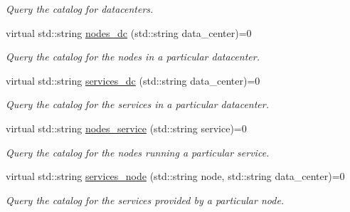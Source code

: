 \begin{DoxyCompactItemize}
\begin{DoxyCompactList}\small\item\em Query the catalog for datacenters. \end{DoxyCompactList}\item 
virtual std\+::string \hyperlink{classConsulInterface_a0831246af1b80ce5bbe074a47333c615}{nodes\+\_\+dc} (std\+::string data\+\_\+center)=0\hypertarget{classConsulInterface_a0831246af1b80ce5bbe074a47333c615}{}\label{classConsulInterface_a0831246af1b80ce5bbe074a47333c615}

\begin{DoxyCompactList}\small\item\em Query the catalog for the nodes in a particular datacenter. \end{DoxyCompactList}\item 
virtual std\+::string \hyperlink{classConsulInterface_ab1c3f2169a8aebdb5a66cfe8211330dc}{services\+\_\+dc} (std\+::string data\+\_\+center)=0\hypertarget{classConsulInterface_ab1c3f2169a8aebdb5a66cfe8211330dc}{}\label{classConsulInterface_ab1c3f2169a8aebdb5a66cfe8211330dc}

\begin{DoxyCompactList}\small\item\em Query the catalog for the services in a particular datacenter. \end{DoxyCompactList}\item 
virtual std\+::string \hyperlink{classConsulInterface_a7490a960b2e10855c7d7ff09d87942b8}{nodes\+\_\+service} (std\+::string service)=0\hypertarget{classConsulInterface_a7490a960b2e10855c7d7ff09d87942b8}{}\label{classConsulInterface_a7490a960b2e10855c7d7ff09d87942b8}

\begin{DoxyCompactList}\small\item\em Query the catalog for the nodes running a particular service. \end{DoxyCompactList}\item 
virtual std\+::string \hyperlink{classConsulInterface_abbd5b2839d3548d48e93074a53844f40}{services\+\_\+node} (std\+::string node, std\+::string data\+\_\+center)=0\hypertarget{classConsulInterface_abbd5b2839d3548d48e93074a53844f40}{}\label{classConsulInterface_abbd5b2839d3548d48e93074a53844f40}

\begin{DoxyCompactList}\small\item\em Query the catalog for the services provided by a particular node. \end{DoxyCompactList}\end{DoxyCompactItemize}


